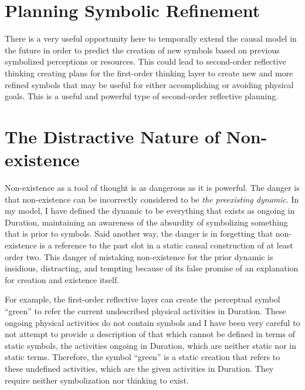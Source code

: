 \section{Planning Symbolic Refinement}

There is a very useful opportunity here to temporally extend the
causal model in the future in order to predict the creation of new
symbols based on previous symbolized perceptions or resources.  This
could lead to second-order reflective thinking creating plans for the
first-order thinking layer to create new and more refined symbols that
may be useful for either accomplishing or avoiding physical goals.
This is a useful and powerful type of second-order reflective
planning.

\section{The Distractive Nature of Non-existence}

Non-existence as a tool of thought is as dangerous as it is powerful.
The danger is that non-existence can be incorrectly considered to be
\emph{the preexisting dynamic}.  In my model, I have defined the
dynamic to be everything that exists as ongoing in Duration,
maintaining an awareness of the absurdity of symbolizing something
that is prior to symbols.  Said another way, the danger is in
forgetting that non-existence is a reference to the past slot in a
static causal construction of at least order two.  This danger of
mistaking non-existence for the prior dynamic is insidious,
distracting, and tempting because of its false promise of an
explanation for creation and existence itself.

For example, the first-order reflective layer can create the
perceptual symbol ``green'' to refer the current undescribed physical
activities in Duration.  These ongoing physical activities do not
contain symbols and I have been very careful to not attempt to provide
a description of that which cannot be defined in terms of static
symbols, the activities ongoing in Duration, which are neither static
nor in static terms.  Therefore, the symbol ``green'' is a static
creation that refers to these undefined activities, which are the
given activities in Duration.  They require neither symbolization nor
thinking to exist.

